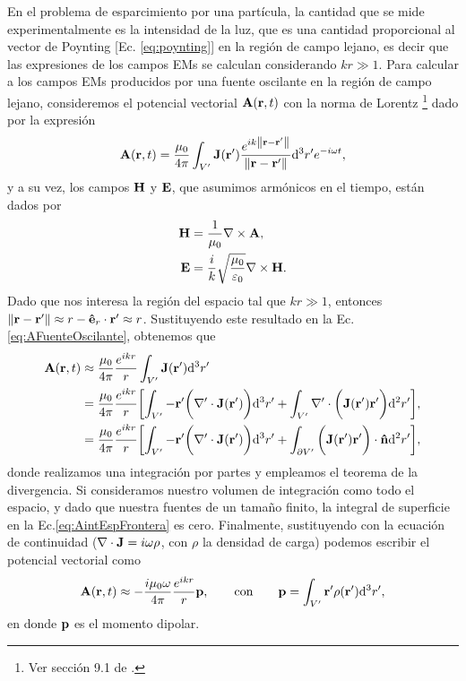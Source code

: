 En el problema de esparcimiento por una partícula, la cantidad que se mide experimentalmente es la
intensidad de la luz, que es una cantidad proporcional al vector de Poynting [Ec. \eqref{eq:poynting}] en la región de campo lejano, es decir que las expresiones de los campos EMs se calculan considerando $kr\gg 1$. Para calcular a los campos EMs producidos por una fuente oscilante en la región de campo lejano, consideremos el potencial vectorial $\vb{A}(\vb{r},t)$ con la norma de Lorentz \footnote{Ver sección 9.1 de \cite{jackson1999electrodynamics}.} dado por la expresión
%
\begin{align}
\vb{A}(\vb{r},t) = \frac{\mu_0}{4\pi}\int_{V'}\vb{J}(\vb{r}')\frac{e^{ik\norm{\vb{r}-\vb{r}'}}}{\norm{\vb{r}-\vb{r}'}} \dd^3r'e^{-i\omega t},
 \label{eq:AFuenteOscilante}
\end{align}
%
y a su vez, los campos $\vb{H}$ y $\vb{E}$, que asumimos armónicos en el tiempo, están dados por
%
\begin{align}
\vb{H} &= \frac{1}{\mu_0}\nabla\times\vb{A},
\label{eq:H=curlA}\\
\vb{E} &= \frac{i}{k}\sqrt{\frac{\mu_0}{\varepsilon_0}}\nabla\times\vb{H}.
\label{eq:E=curlcurlA}
\end{align}
%
Dado que nos interesa la región del espacio tal que $kr\gg 1$, entonces $\norm{\vb{r}-\vb{r}'}\approx r-\vu{e}_r\cdot\vb{r}'\approx r$. Sustituyendo este resultado en la Ec. \eqref{eq:AFuenteOscilante}, obtenemos que
%
\begin{align}
\vb{A}(\vb{r},t) &\approx \frac{\mu_0}{4\pi}\frac{e^{ikr}}{r}\int_{V'}\vb{J}(\vb{r}')\dd^3r'\\
		&=  \frac{\mu_0}{4\pi}\frac{e^{ikr}}{r}\qty[
			\int_{V'}-\vb{r}'\bigg(\nabla'\cdot\vb{J}(\vb{r}')\bigg)\dd^3r'	+\int_{ V'}\nabla'\cdot\bigg(\vb{J}(\vb{r}')\vb{r}'\bigg)\dd^2r'],\\
		&= \frac{\mu_0}{4\pi}\frac{e^{ikr}}{r}\qty[
			\int_{V'}-\vb{r}'\bigg(\nabla'\cdot\vb{J}(\vb{r}')\bigg)\dd^3r'	+\int_{\partial V'}\bigg(\vb{J}(\vb{r}')\vb{r}'\bigg)\cdot\vu{n}\dd^2r'],
\label{eq:AintEspFrontera}
\end{align}
%
donde realizamos una integración por partes y empleamos el teorema de la divergencia. Si consideramos nuestro volumen de integración como todo el espacio, y dado que nuestra fuentes de un tamaño finito, la integral de superficie en la Ec.\eqref{eq:AintEspFrontera} es cero. Finalmente,  sustituyendo con la ecuación de continuidad ($\nabla\cdot\vb{J} = i\omega\rho$, con $\rho$ la densidad de carga) podemos escribir el potencial vectorial como 
%
\begin{align}
\vb{A}(\vb{r},t)  \approx -\frac{i\mu_0\omega}{4\pi}\frac{e^{ikr}}{r}\vb{p},\qquad
\text{con}\qquad \vb{p} = \int_{V'}\vb{r}'\rho(\vb{r}')\dd^3r',
\label{eq:Aoscilante}
\end{align}
%
en donde $\vb{p}$ es el momento dipolar.

